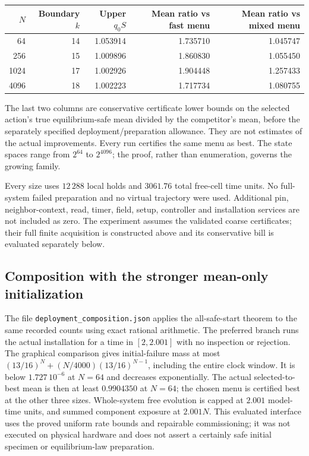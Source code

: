 \begin{center}
\begin{tabular}{rrrrr}
\toprule
$N$&Boundary $k$&Upper $q_0S$&Mean ratio vs fast menu&Mean ratio vs mixed menu\\
\midrule
64&14&1.053914&1.735710&1.045747\\
256&15&1.009896&1.860830&1.055450\\
1024&17&1.002926&1.904448&1.257433\\
4096&18&1.002223&1.717734&1.080755\\
\bottomrule
\end{tabular}
\end{center}
The last two columns are conservative certificate lower bounds on the selected action's true equilibrium-safe mean divided by the competitor's mean, before the separately specified deployment/preparation allowance. They are not estimates of the actual improvements. Every run certifies the same menu as best. The state spaces range from $2^{64}$ to $2^{4096}$; the proof, rather than enumeration, governs the growing family.

Every size uses $12\,288$ local holds and $3061.76$ total free-cell time units. No full-system failed preparation and no virtual trajectory were used. Additional pin, neighbor-context, read, timer, field, setup, controller and installation services are not included as zero. The experiment assumes the validated coarse certificates; their full finite acquisition is constructed above and its conservative bill is evaluated separately below.

\subsection{Composition with the stronger mean-only initialization}
The file \texttt{deployment\_composition.json} applies the all-safe-start
theorem to the same recorded counts using exact rational arithmetic.
The preferred branch runs the actual installation for a time in
$[2,2.001]$ with no inspection or rejection. The graphical comparison
gives initial-failure mass at most
$(13/16)^N+(N/4000)(13/16)^{N-1}$, including the entire clock window.
It is below $1.727\,10^{-6}$ at $N=64$ and decreases exponentially.
The actual selected-to-best mean is then at least $0.9904350$ at
$N=64$; the chosen menu is certified best at the other three sizes.
Whole-system free evolution is capped at $2.001$ model-time units,
and summed component exposure at $2.001N$. This evaluated interface
uses the proved uniform rate bounds and repairable commissioning;
it was not executed on physical hardware and does not assert a
certainly safe initial specimen or equilibrium-law preparation.

